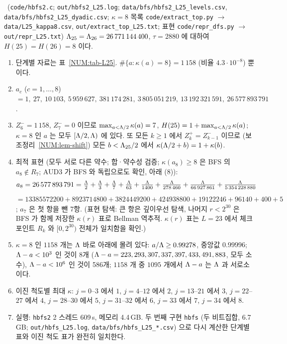 \begin{theorem}[수치 결과]\label{NUM:thm-H25}
\NUMERIC\ (\texttt{code/hbfs2.c}; \texttt{out/hbfs2\_L25.log}; \texttt{data/bfs/hbfs2\_L25\_levels.csv}, \texttt{data/bfs/hbfs2\_L25\_dyadic.csv};
$\kappa=8$ 목록 \texttt{code/extract\_top.py} $\to$ \texttt{data/L25\_kappa8.csv}, \texttt{out/extract\_top\_L25.txt};
표현 \texttt{code/repr\_dfs.py} $\to$ \texttt{out/repr\_L25.txt})
$\Lambda_{25}=\Lambda_{26}=26\,771\,144\,400$, $\tau=2880$ 에 대하여 $H(25)=H(26)=8$ 이다.
\begin{enumerate}[label=(\arabic*)]
\item 단계별 자료는 표~\ref{NUM:tab-L25}. $\#\{a:\kappa(a)=8\}=1\,158$ (비율 $4.3\cdot10^{-8}$) 뿐이다.
\item $a_c$ ($c=1,\dots,8$) $=1,\ 27,\ 10\,103,\ 5\,959\,627,\ 381\,174\,281,\ 3\,805\,051\,219,\ 13\,192\,321\,591,\ 26\,577\,893\,791$.
\item $Z^-_6=1\,158$, $Z^-_7=0$ 이므로 $\max_{a<\Lambda/2}\kappa(a)=7$, $H(25)=1+\max_{a<\Lambda/2}\kappa(a)$; $\kappa=8$ 인 $a$ 는 모두 $[\Lambda/2,\Lambda)$ 에 있다.
또 모든 $k\ge1$ 에서 $Z^+_k=Z^-_{k-1}$ 이므로 (보조정리~\ref{NUM:lem-shift}) 모든 $b<\Lambda_{25}/2$ 에서 $\kappa(\Lambda/2+b)=1+\kappa(b)$.
\item 최적 표현 (모두 서로 다른 약수; 합·약수성 검증; $\kappa(a_8)\ge8$ 은 BFS 의 $a_8\notin R_7$; AUD3 가 BFS 와 독립으로도 확인, 아래 (8)):
\[
a_8=26\,577\,893\,791=\tfrac{\Lambda}{2}+\tfrac{\Lambda}{3}+\tfrac{\Lambda}{7}+\tfrac{\Lambda}{63}+\tfrac{\Lambda}{1400}+\tfrac{\Lambda}{278\,460}+\tfrac{\Lambda}{66\,927\,861}+\tfrac{\Lambda}{5\,354\,228\,880}
\]
$=13385572200+8923714800+3824449200+424938800+19122246+96140+400+5$; $a_7$ 은 첫 항을 뺀 7항.
(표현 탐색: 큰 항은 깊이우선 탐색, 나머지 $r<2^{30}$ 은 BFS 가 함께 저장한 $\kappa(r)$ 표로 Bellman 역추적. $\kappa(r)$ 표는 $L=23$ 에서 체크포인트 $R_k$ 와 $[0,2^{30})$ 전체가 일치함을 확인.)
\item $\kappa=8$ 인 $1158$ 개는 $\Lambda$ 바로 아래에 몰려 있다: $a/\Lambda\ge0.99278$, 중앙값 $0.99996$;
$\Lambda-a<10^3$ 인 것이 8개 ($\Lambda-a=223,293,307,337,397,433,491,883$, 모두 소수), $\Lambda-a<10^6$ 인 것이 586개; $1158$ 개 중 $1095$ 개에서 $\Lambda-a$ 는 $\Lambda$ 과 서로소이다.
\item 이진 척도별 최대 $\kappa$: $j=0$--$3$ 에서 $1$, $j=4$--$12$ 에서 $2$, $j=13$--$21$ 에서 $3$, $j=22$--$27$ 에서 $4$, $j=28$--$30$ 에서 $5$, $j=31$--$32$ 에서 $6$, $j=33$ 에서 $7$, $j=34$ 에서 $8$.
\item 실행: \texttt{hbfs2} 2 스레드 609\,s, 메모리 4.4\,GB. 두 번째 구현 \texttt{hbfs} (두 비트집합, 6.7\,GB; \texttt{out/hbfs\_L25.log}, \texttt{data/bfs/hbfs\_L25\_*.csv}) 으로 다시 계산한 단계별 표와 이진 척도 표가 완전히 일치한다.

\end{enumerate}
\end{theorem}
